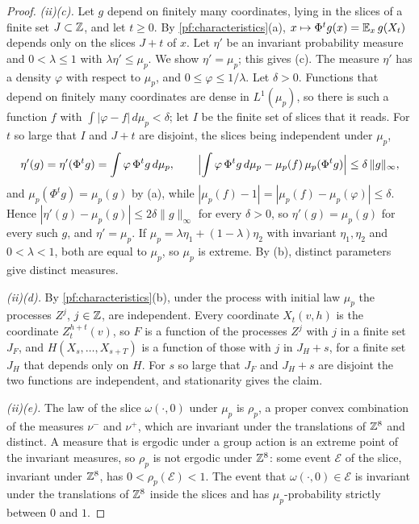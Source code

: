 \begin{proof}
\emph{(ii)(c).} Let $g$ depend on finitely many coordinates, lying in the slices of a finite set $J\subset\mathbb{Z}$, and let $t\ge0$. By \cref{pf:characteristics}(a), $x\mapsto\Phi^tg(x)=\mathbb{E}_x\,g(X_t)$ depends only on the slices $J+t$ of $x$. Let $\eta'$ be an invariant probability measure and $0<\lambda\le1$ with $\lambda\eta'\le\mu_p$. We show $\eta'=\mu_p$; this gives (c). The measure $\eta'$ has a density $\varphi$ with respect to $\mu_p$, and $0\le\varphi\le1/\lambda$. Let $\delta>0$. Functions that depend on finitely many coordinates are dense in $L^1(\mu_p)$, so there is such a function $f$ with $\int|\varphi-f|\,d\mu_p<\delta$; let $I$ be the finite set of slices that it reads. For $t$ so large that $I$ and $J+t$ are disjoint, the slices being independent under $\mu_p$,
\[
\eta'(g)=\eta'(\Phi^tg)=\int\varphi\,\Phi^tg\,d\mu_p,\qquad\Bigl|\int\varphi\,\Phi^tg\,d\mu_p-\mu_p(f)\,\mu_p(\Phi^tg)\Bigr|\le\delta\,\|g\|_\infty,
\]
and $\mu_p(\Phi^tg)=\mu_p(g)$ by (a), while $|\mu_p(f)-1|=|\mu_p(f)-\mu_p(\varphi)|\le\delta$. Hence $|\eta'(g)-\mu_p(g)|\le2\delta\|g\|_\infty$ for every $\delta>0$, so $\eta'(g)=\mu_p(g)$ for every such $g$, and $\eta'=\mu_p$. If $\mu_p=\lambda\eta_1+(1-\lambda)\eta_2$ with invariant $\eta_1,\eta_2$ and $0<\lambda<1$, both are equal to $\mu_p$, so $\mu_p$ is extreme. By (b), distinct parameters give distinct measures.

\emph{(ii)(d).} By \cref{pf:characteristics}(b), under the process with initial law $\mu_p$ the processes $Z^j$, $j\in\mathbb{Z}$, are independent. Every coordinate $X_t(v,h)$ is the coordinate $Z^{h+t}_t(v)$, so $F$ is a function of the processes $Z^j$ with $j$ in a finite set $J_F$, and $H(X_s,\dots,X_{s+T})$ is a function of those with $j$ in $J_H+s$, for a finite set $J_H$ that depends only on $H$. For $s$ so large that $J_F$ and $J_H+s$ are disjoint the two functions are independent, and stationarity gives the claim.

\emph{(ii)(e).} The law of the slice $\omega(\cdot,0)$ under $\mu_p$ is $\rho_p$, a proper convex combination of the measures $\nu^-$ and $\nu^+$, which are invariant under the translations of $\mathbb{Z}^8$ and distinct. A measure that is ergodic under a group action is an extreme point of the invariant measures, so $\rho_p$ is not ergodic under $\mathbb{Z}^8$: some event $\mathcal E$ of the slice, invariant under $\mathbb{Z}^8$, has $0<\rho_p(\mathcal E)<1$. The event that $\omega(\cdot,0)\in\mathcal E$ is invariant under the translations of $\mathbb{Z}^8$ inside the slices and has $\mu_p$-probability strictly between $0$ and $1$.


\end{proof}
